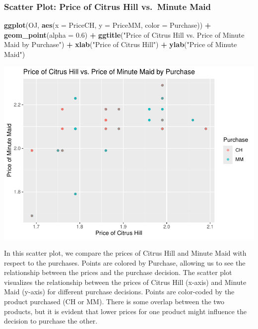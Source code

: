 \documentclass[
]{article}
\newenvironment{Shaded}{\begin{snugshade}}{\end{snugshade}}
\newcommand{\AttributeTok}[1]{\textcolor[rgb]{0.13,0.29,0.53}{#1}}
\newcommand{\FloatTok}[1]{\textcolor[rgb]{0.00,0.00,0.81}{#1}}
\newcommand{\FunctionTok}[1]{\textcolor[rgb]{0.13,0.29,0.53}{\textbf{#1}}}
\newcommand{\NormalTok}[1]{#1}
\newcommand{\SpecialCharTok}[1]{\textcolor[rgb]{0.81,0.36,0.00}{\textbf{#1}}}
\newcommand{\StringTok}[1]{\textcolor[rgb]{0.31,0.60,0.02}{#1}}
\begin{document}
\hypertarget{scatter-plot-price-of-citrus-hill-vs.-minute-maid}{%
\subsubsection{Scatter Plot: Price of Citrus Hill vs.~Minute
Maid}\label{scatter-plot-price-of-citrus-hill-vs.-minute-maid}}

\begin{Shaded}
\begin{Highlighting}[]
\FunctionTok{ggplot}\NormalTok{(OJ, }\FunctionTok{aes}\NormalTok{(}\AttributeTok{x =}\NormalTok{ PriceCH, }\AttributeTok{y =}\NormalTok{ PriceMM, }\AttributeTok{color =}\NormalTok{ Purchase)) }\SpecialCharTok{+}
  \FunctionTok{geom\_point}\NormalTok{(}\AttributeTok{alpha =} \FloatTok{0.6}\NormalTok{) }\SpecialCharTok{+}
  \FunctionTok{ggtitle}\NormalTok{(}\StringTok{"Price of Citrus Hill vs. Price of Minute Maid by Purchase"}\NormalTok{) }\SpecialCharTok{+}
  \FunctionTok{xlab}\NormalTok{(}\StringTok{"Price of Citrus Hill"}\NormalTok{) }\SpecialCharTok{+} \FunctionTok{ylab}\NormalTok{(}\StringTok{"Price of Minute Maid"}\NormalTok{)}
\end{Highlighting}
\end{Shaded}

\includegraphics{OJ_files/figure-latex/unnamed-chunk-4-1.pdf}

In this scatter plot, we compare the prices of Citrus Hill and Minute
Maid with respect to the purchases. Points are colored by Purchase,
allowing us to see the relationship between the prices and the purchase
decision. The scatter plot visualizes the relationship between the
prices of Citrus Hill (x-axis) and Minute Maid (y-axis) for different
purchase decisions. Points are color-coded by the product purchased (CH
or MM). There is some overlap between the two products, but it is
evident that lower prices for one product might influence the decision
to purchase the other.
\end{document}
